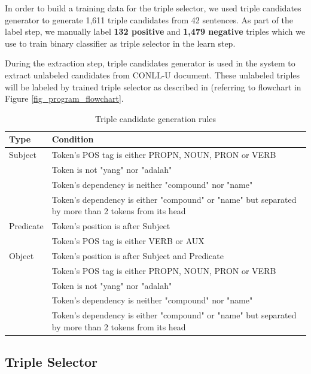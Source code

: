 \documentclass[conference,compsoc,12pt]{IEEEtran}
\begin{document}
In order to build a training data for the triple selector, we used triple candidates generator to generate 1,611 triple candidates from 42 sentences. As part of the label step, we manually label \textbf{132 positive} and \textbf{1,479 negative} triples which we use to train binary classifier as triple selector in the learn step.

During the extraction step, triple candidates generator is used in the system to extract unlabeled candidates from CONLL-U document. These unlabeled triples will be labeled by trained triple selector as described in  (referring to flowchart in Figure \ref{fig_program_flowchart}.

\begin{table}[!t]
\renewcommand{\arraystretch}{1.5}
\caption{Triple candidate generation rules}
\label{table_triple_candidate_generation_rules}
\centering
\begin{tabular}{l p{6cm}}
\hline
\textbf{Type} & \textbf{Condition} \\
\hline
Subject & Token's POS tag is either PROPN, NOUN, PRON or VERB \\
\space & Token is not "yang" nor "adalah" \\
\space & Token's dependency is neither "compound" nor "name" \\
\space & Token's dependency is either "compound" or "name" but separated by more than 2 tokens from its head \\
\hline
Predicate & Token's position is after Subject \\
\space & Token's POS tag is either VERB or AUX \\
\hline
Object & Token's position is after Subject and Predicate \\
\space & Token's POS tag is either PROPN, NOUN, PRON or VERB \\
\space & Token is not "yang" nor "adalah" \\
\space & Token's dependency is neither "compound" nor "name" \\
\space & Token's dependency is either "compound" or "name" but separated by more than 2 tokens from its head \\
\end{tabular}
\end{table}


\subsection{Triple Selector}  \label{Triple Selector}
\end{document}
